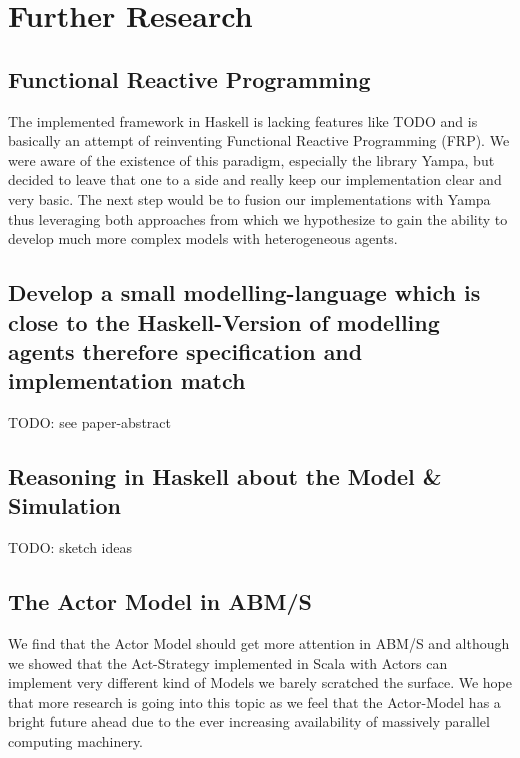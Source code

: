 \section{Further Research}

\subsection{Functional Reactive Programming}
The implemented framework in Haskell is lacking features like TODO and is basically an attempt of reinventing Functional Reactive Programming (FRP). We were aware of the existence of this paradigm, especially the library Yampa, but decided to leave that one to a side and really keep our implementation clear and very basic. The next step would be to fusion our implementations with Yampa thus leveraging both approaches from which we hypothesize to gain the ability to develop much more complex models with heterogeneous agents.

\subsection{Develop a small modelling-language which is close to the Haskell-Version of modelling agents therefore specification and implementation match}
TODO: see paper-abstract

\subsection{Reasoning in Haskell about the Model \& Simulation}
TODO: sketch ideas

\subsection{The Actor Model in ABM/S}
We find that the Actor Model should get more attention in ABM/S and although we showed that the Act-Strategy implemented in Scala with Actors can implement very different kind of Models we barely scratched the surface. We hope that more research is going into this topic as we feel that the Actor-Model has a bright future ahead due to the ever increasing availability of massively parallel computing machinery.